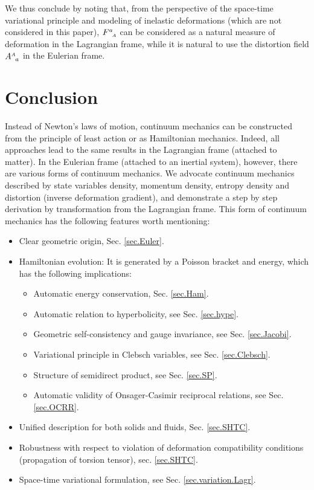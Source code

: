 \documentclass[
10pt, %
a4paper, %
oneside, %
headinclude,footinclude, %
BCOR5mm, %
]{scrartcl}
\newcommand{\F}[2]{F^{#1}_{\ \, \mathsmaller#2}}
\newcommand{\A}[2]{A^{\mathsmaller#1}_{\ \, #2}}
\begin{document}
We thus conclude by noting that, from the perspective of the space-time 
variational 
principle and 
modeling of inelastic deformations (which are not considered in this paper), $\F{a}{A}$ can be 
considered as a natural measure of deformation in the Lagrangian frame, while it is natural to use 
the distortion field $ \A{A}{a} $ in the Eulerian frame.

\section{Conclusion}
Instead of Newton's laws of motion, continuum mechanics can be constructed from the principle of 
least action or as Hamiltonian mechanics. Indeed, all approaches lead to the same results in the 
Lagrangian frame (attached to matter). In the Eulerian frame (attached to an inertial system), 
however, there are various forms of continuum mechanics. We advocate continuum mechanics described 
by state variables density, momentum density, entropy density and distortion (inverse deformation 
gradient), and demonstrate a step by step derivation by transformation from the Lagrangian frame. 
This form of continuum mechanics has the following features worth mentioning: 
\begin{itemize}
    \item Clear geometric origin, Sec. \ref{sec.Euler}.
    \item Hamiltonian evolution: It is generated by a Poisson bracket and energy, which has the 
    following implications:
    \begin{itemize}
        \item Automatic energy conservation, Sec. \ref{sec.Ham}.
        \item Automatic relation to hyperbolicity, see Sec. \ref{sec.hype}.
        \item Geometric self-consistency and gauge invariance, see Sec. \ref{sec.Jacobi}.
        \item Variational principle in Clebsch variables, see Sec. \ref{sec.Clebsch}.
        \item Structure of semidirect product, see Sec. \ref{sec.SP}.
        \item Automatic validity of Onsager-Casimir reciprocal relations, see Sec. \ref{sec.OCRR}.
    \end{itemize}
    \item Unified description for both solids and fluids, Sec. \ref{sec.SHTC}.
    \item Robustness with respect to violation of deformation compatibility conditions 
(propagation of torsion tensor), sec. \ref{sec.SHTC}.
    \item Space-time variational formulation, see Sec. \ref{sec.variation.Lagr}.
\end{itemize}
\end{document}
